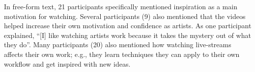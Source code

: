 In free-form text, 21 participants specifically mentioned inspiration as a main motivation for watching. Several participants (9) also mentioned that the videos helped increase their own motivation and confidence as artists. As one participant explained, ``[I] like watching artists work because it takes the mystery out of what they do''. Many participants (20) also mentioned how watching live-streams affects their own work; e.g., they learn techniques they can apply to their own workflow and get inspired with new ideas.